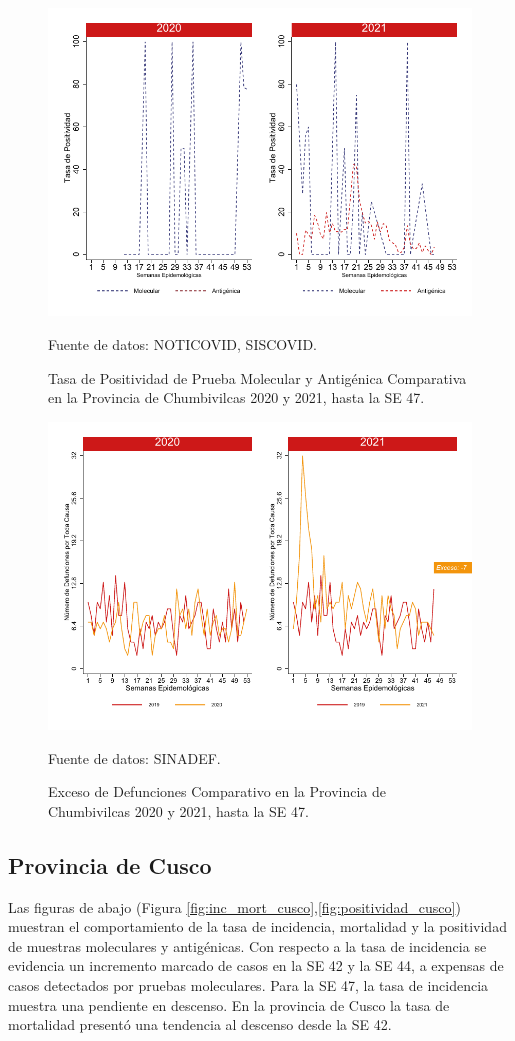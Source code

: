 \documentclass[12pt,a4paper,openany]{book}
\begin{document}
		\begin{figure}[h]
			\caption{Tasa de Positividad de Prueba Molecular y Antigénica Comparativa en la Provincia de Chumbivilcas 2020 y 2021, hasta la SE 47.}\label{fig:positividad_chumbivilcas}
			\begin{center}
				\includegraphics[width=0.7\linewidth]{../figuras/positividad_20_21_6}
			\end{center}
			{\footnotesize {Fuente de datos: NOTICOVID, SISCOVID.}}
		\end{figure}
		
		\begin{figure}[h]
			\caption{Exceso de Defunciones Comparativo en la Provincia de Chumbivilcas 2020 y 2021, hasta la SE 47.}\label{fig:exceso_chumbivilcas}
			\begin{center}
				\includegraphics[width=0.7\linewidth]{../figuras/exceso_6}
			\end{center}
			{\footnotesize {Fuente de datos: SINADEF.}}
		\end{figure}
		
		\clearpage
		
		\subsection*{Provincia de Cusco}
		\noindent Las figuras de abajo (Figura \ref{fig:inc_mort_cusco},\ref{fig:positividad_cusco}) muestran el comportamiento de la tasa de incidencia, mortalidad y la positividad de muestras moleculares y antigénicas. Con respecto a la tasa de incidencia se evidencia un incremento marcado de casos en la SE 42 y la SE 44, a expensas de casos detectados por pruebas moleculares. Para la SE 47, la tasa de incidencia muestra una pendiente en descenso. En la provincia de Cusco la tasa de mortalidad presentó una tendencia al descenso desde la SE 42.
	
\end{document}
